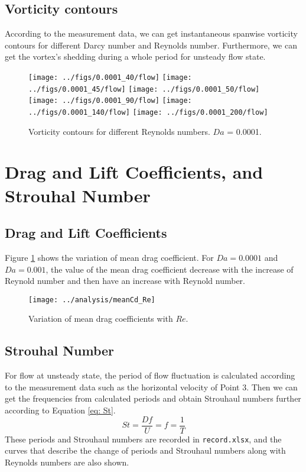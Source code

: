 \subsection{Vorticity contours}
According to the measurement data, we can get instantaneous spanwise
vorticity contours for different Darcy number and Reynolds number. 
Furthermore, we can get the vortex's shedding during a whole period
for unsteady flow state.
\begin{figure}[h]
	\centering
	{\texttt{[image: ../figs/0.0001\_40/flow]}}
	{\texttt{[image: ../figs/0.0001\_45/flow]}}
	{\texttt{[image: ../figs/0.0001\_50/flow]}}
	{\texttt{[image: ../figs/0.0001\_90/flow]}}
	{\texttt{[image: ../figs/0.0001\_140/flow]}}
	{\texttt{[image: ../figs/0.0001\_200/flow]}}
	\caption{Vorticity contours for different Reynolds numbers.
		$Da$ = 0.0001.}
\end{figure}


\section{Drag and Lift Coefficients, and Strouhal Number}
\subsection{Drag and Lift Coefficients}
Figure \ref{fig: meanCd} shows the variation of mean drag coefficient. For $Da=0.0001$ and $Da=0.001$, the value of the mean drag coefficient decrease with the increase of Reynold number and then have an increase with Reynold number.
\begin{figure}
	\centering
	\texttt{[image: ../analysis/meanCd\_Re]}
	\caption{Variation of mean drag coefficients with $Re$.}
	\label{fig: meanCd}
\end{figure}

\subsection{Strouhal Number}
For flow at unsteady state, the period of flow fluctuation is calculated
according to the measurement data such as the horizontal velocity of Point 3.
Then we can get the frequencies from calculated periods and obtain
Strouhaul numbers further according to Equation \ref{eq: St}.
\begin{equation}\label{eq: St}
St = \frac{Df}{U} = f = \frac{1}{T}
\end{equation}
These periods and Strouhaul numbers are recorded in \texttt{record.xlsx}, 
and the curves that describe the change of periods and Strouhaul numbers
along with Reynolds numbers are also shown.

